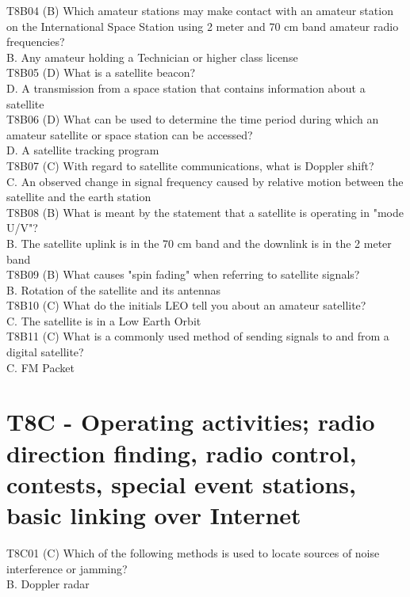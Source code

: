 \documentclass[12pt,letterpaper]{report}
\begin{document}
T8B04 (B) Which amateur stations may make contact with an amateur station on the International Space Station using 2 meter and 70 cm band amateur radio frequencies?\\
B. Any amateur holding a Technician or higher class license\\

T8B05 (D) What is a satellite beacon?\\
D. A transmission from a space station that contains information about a satellite\\

T8B06 (D) What can be used to determine the time period during which an amateur satellite or space station can be accessed?\\
D. A satellite tracking program\\

T8B07 (C) With regard to satellite communications, what is Doppler shift?\\
C. An observed change in signal frequency caused by relative motion between the satellite and the earth station\\

T8B08 (B) What is meant by the statement that a satellite is operating in "mode U/V"?\\
B. The satellite uplink is in the 70 cm band and the downlink is in the 2 meter band\\

T8B09 (B) What causes "spin fading" when referring to satellite signals?\\
B. Rotation of the satellite and its antennas\\

T8B10 (C) What do the initials LEO tell you about an amateur satellite?\\
C. The satellite is in a Low Earth Orbit\\

T8B11 (C) What is a commonly used method of sending signals to and from a digital satellite?\\
C. FM Packet\\

\section{T8C - Operating activities; radio direction finding, radio control, contests, special event stations, basic linking over Internet}

T8C01 (C) Which of the following methods is used to locate sources of noise interference or jamming?\\
B. Doppler radar \\
\end{document}
